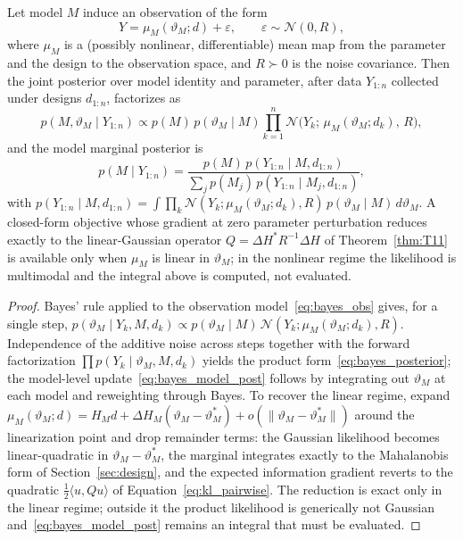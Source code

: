\begin{theorem}
\label{thm:T18}
Let model $M$ induce an observation of the form
\begin{equation}
Y = \mu_M(\vartheta_M; d) + \varepsilon,\qquad
\varepsilon \sim \mathcal{N}(0, R),
\label{eq:bayes_obs}
\end{equation}
where $\mu_M$ is a (possibly nonlinear, differentiable) mean map from the parameter and the design to the observation space, and $R \succ 0$ is the noise covariance. Then the joint posterior over model identity and parameter, after data $Y_{1:n}$ collected under designs $d_{1:n}$, factorizes as
\begin{equation}
p(M, \vartheta_M \mid Y_{1:n})
\propto p(M)\, p(\vartheta_M \mid M)
\prod_{k=1}^{n} \mathcal{N}\!\bigl(Y_k;\, \mu_M(\vartheta_M; d_k),\, R\bigr),
\label{eq:bayes_posterior}
\end{equation}
and the model marginal posterior is
\begin{equation}
p(M \mid Y_{1:n})
= \frac{p(M)\, p(Y_{1:n} \mid M, d_{1:n})}{\sum_{j} p(M_j)\, p(Y_{1:n} \mid M_j, d_{1:n})},
\label{eq:bayes_model_post}
\end{equation}
with $p(Y_{1:n} \mid M, d_{1:n}) = \int \prod_{k} \mathcal{N}(Y_k; \mu_M(\vartheta_M; d_k), R)\, p(\vartheta_M \mid M)\, d\vartheta_M$. A closed-form objective whose gradient at zero parameter perturbation reduces exactly to the linear-Gaussian operator $Q = \Delta H^{*} R^{-1} \Delta H$ of Theorem~\ref{thm:T11} is available only when $\mu_M$ is linear in $\vartheta_M$; in the nonlinear regime the likelihood is multimodal and the integral above is computed, not evaluated.
\end{theorem}

\begin{proof}
Bayes' rule applied to the observation model~\eqref{eq:bayes_obs} gives, for a single step, $p(\vartheta_M \mid Y_k, M, d_k) \propto p(\vartheta_M \mid M)\, \mathcal{N}(Y_k; \mu_M(\vartheta_M; d_k), R)$. Independence of the additive noise across steps together with the forward factorization $\prod p(Y_k \mid \vartheta_M, M, d_k)$ yields the product form~\eqref{eq:bayes_posterior}; the model-level update~\eqref{eq:bayes_model_post} follows by integrating out $\vartheta_M$ at each model and reweighting through Bayes. To recover the linear regime, expand $\mu_M(\vartheta_M; d) = H_M d + \Delta H_M (\vartheta_M - \vartheta_M^{*}) + o(\|\vartheta_M - \vartheta_M^{*}\|)$ around the linearization point and drop remainder terms: the Gaussian likelihood becomes linear-quadratic in $\vartheta_M - \vartheta_M^{*}$, the marginal integrates exactly to the Mahalanobis form of Section~\ref{sec:design}, and the expected information gradient reverts to the quadratic $\tfrac{1}{2} \langle u, Q u \rangle$ of Equation~\eqref{eq:kl_pairwise}. The reduction is exact only in the linear regime; outside it the product likelihood is generically not Gaussian and~\eqref{eq:bayes_model_post} remains an integral that must be evaluated.
\end{proof}

